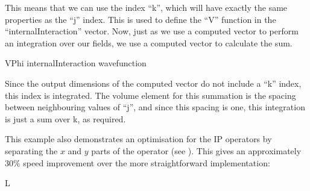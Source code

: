 \documentclass[letterpaper,10pt,english]{sphinxmanual}
\begin{document}
\sphinxAtStartPar
This means that we can use the index “k”, which will have exactly the same properties as the “j” index.  This is used to define the “V” function in the “internalInteraction” vector.  Now, just as we use a computed vector to perform an integration over our fields, we use a computed vector to calculate the sum.

\begin{sphinxVerbatim}[commandchars=\\\{\}]
   
    VPhi
     internalInteraction wavefunction
    \PYG{c+cp}{\PYGZlt{}![CDATA[}
          
    \PYG{c+cp}{]]\PYGZgt{}}
\end{sphinxVerbatim}

\sphinxAtStartPar
Since the output dimensions of the computed vector do not include a “k” index, this index is integrated.  The volume element for this summation is the spacing between neighbouring values of “j”, and since this spacing is one, this integration is just a sum over k, as required.

\sphinxAtStartPar
This example also demonstrates an optimisation for the IP operators by separating the \(x\) and \(y\) parts of the operator (see {\hyperref[\detokenize{optimisation_hints:optimisingipoperators}]{}}).  This gives an approximately 30\% speed improvement over the more straightforward implementation:

\begin{sphinxVerbatim}[commandchars=\\\{\}]
 
  L
  \PYG{c+cp}{\PYGZlt{}![CDATA[}
        
  \PYG{c+cp}{]]\PYGZgt{}}
\PYG{c+cp}{\PYGZlt{}![CDATA[}
    \PYG{p}{[}\PYG{p}{]}  
\PYG{c+cp}{]]\PYGZgt{}}
\end{sphinxVerbatim}
\end{document}
